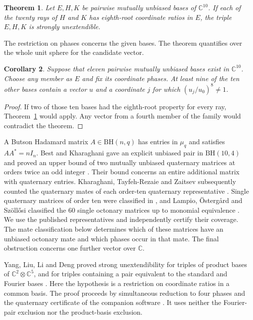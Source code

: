 \documentclass[11pt]{article}
\newtheorem{theorem}{Theorem}
\newtheorem{corollary}[theorem]{Corollary}
\newcommand{\C}{\mathbb C}
\newcommand{\BH}{\mathrm{BH}}
\begin{document}
\begin{theorem}\label{th:main}
Let \(E,H,K\) be pairwise mutually unbiased bases of \(\C^{10}\).
If each of the twenty rays of \(H\) and \(K\) has eighth-root coordinate
ratios in \(E\), the triple \(E,H,K\) is strongly unextendible.
\end{theorem}

The restriction on phases concerns the given bases. The theorem quantifies
over the whole unit sphere for the candidate vector.

\begin{corollary}\label{co:eleven}
Suppose that eleven pairwise mutually unbiased bases exist in \(\C^{10}\).
Choose any member as \(E\) and fix its coordinate phases. At least nine
of the ten other bases contain a vector \(u\) and a coordinate \(j\)
for which \((u_j/u_0)^8\ne1\).
\end{corollary}
\begin{proof}
If two of those ten bases had the eighth-root property for every ray,
Theorem~\ref{th:main} would apply. Any vector from a fourth member of
the family would contradict the theorem.
\end{proof}

A Butson Hadamard matrix \(A\in\BH(n,q)\) has entries in \(\mu_q\)
and satisfies \(AA^*=nI_n\). Best and Kharaghani gave an explicit unbiased
pair in \(\BH(10,4)\) and proved an upper bound of two mutually unbiased
quaternary matrices at orders twice an odd integer \cite{best}.
Their bound concerns an entire additional matrix with quaternary entries.
Kharaghani, Tayfeh-Rezaie and Zaitsev subsequently counted the
quaternary mates of each order-ten quaternary representative
\cite[Table~4]{regular}. Single quaternary matrices of order ten were
classified in \cite{quaternary}, and Lampio, \"Osterg{\aa}rd and
Sz\"oll\H{o}si classified the 60 single octonary matrices up to
monomial equivalence \cite{orderly,data}. We use the published
representatives and independently certify their coverage. The mate
classification below determines which of these matrices have an
unbiased octonary mate and which phases occur in that mate. The
final obstruction concerns one further vector over \(\C\).

Yang, Liu, Li and Deng proved strong unextendibility for triples of
product bases of \(\C^2\otimes\C^5\), and for triples containing a pair
equivalent to the standard and Fourier bases \cite[Theorems~A and~B]{yang}.
Here the hypothesis is a restriction on coordinate ratios in a common
basis. The proof proceeds by simultaneous reduction to four phases
and the quaternary certificate of the companion software \cite{software}.
It uses neither the Fourier-pair exclusion nor the product-basis exclusion.
\end{document}
